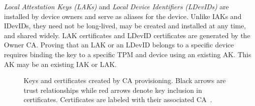 \documentclass[runningheads]{llncs}
\begin{document}

\emph{Local Attestation Keys (LAKs)} and 
\emph{Local Device Identifiers (LDevIDs)} are installed by device owners
and serve as aliases for the device. Unlike IAKs and IDevIDs, they
need not be long-lived, may be created and installed at any time, and
shared widely. LAK certificates and LDevID certificates are generated by
the Owner CA. Proving that an LAK or an LDevID belongs to a specific device 
requires binding the key to a specific TPM and device using an existing AK. 
This AK may be an existing IAK or LAK. 





\begin{figure}[hbtp]
  \centering
  
  \caption{Keys and certificates created by CA provisioning.
    Black arrows are trust relationships while red
    arrows denote key inclusion in certificates. Certificates are
    labeled with their associated CA~\citep{DevIDSpec-TCG}.}
  \label{fig:cert_rel}
\end{figure}
\end{document}
